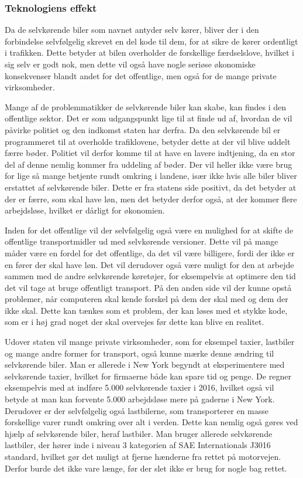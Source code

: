 \subsubsection{Teknologiens effekt}
Da de selvkørende biler som navnet antyder selv kører, bliver der i den forbindelse selvfølgelig skrevet en del kode til dem, for at sikre de kører ordentligt i trafikken. Dette betyder at bilen overholder de forskellige færdselslove, hvilket i sig selv er godt nok, men dette vil også have nogle seriøse økonomiske konsekvenser blandt andet for det offentlige, men også for de mange private virksomheder. 

Mange af de problemmatikker de selvkørende biler kan skabe, kan findes i den offentlige sektor. Det er som udgangspunkt lige til at finde ud af, hvordan de vil påvirke politiet og den indkomst staten har derfra. Da den selvkørende bil er programmeret til at overholde trafiklovene, betyder dette at der vil blive uddelt færre bøder. Politiet vil derfor komme til at have en lavere indtjening, da en stor del af denne nemlig kommer fra uddeling af bøder\cite{B}. Der vil heller ikke være brug for lige så mange betjente rundt omkring i landene, især ikke hvis alle biler bliver erstattet af selvkørende biler. Dette er fra statens side positivt, da det betyder at der er færre, som skal have løn, men det betyder derfor også, at der kommer flere arbejdsløse, hvilket er dårligt for økonomien.

Inden for det offentlige vil der selvfølgelig også være en mulighed for at skifte de offentlige transportmidler ud med selvkørende versioner. Dette vil på mange måder være en fordel for det offentlige, da det vil være billigere, fordi der ikke er en fører der skal have løn. Det vil derudover også være muligt for den at arbejde sammen med de andre selvkørende køretøjer, for eksempelvis at optimere den tid det vil tage at bruge offentligt transport. På den anden side vil der kunne opstå problemer, når computeren skal kende forskel på dem der skal med og dem der ikke skal. Dette kan tænkes som et problem, der kan løses med et stykke kode, som er i høj grad noget der skal overvejes før dette kan blive en realitet\cite{BUS}.

Udover staten vil mange private virksomheder, som for eksempel taxier, lastbiler og mange andre former for transport, også kunne mærke denne ændring til selvkørende biler. Man er allerede i New York begyndt at eksperimentere med selvkørende taxier, hvilket for firmaerne både kan spare tid og penge. De regner eksempelvis med at indføre 5.000 selvkørende taxier i 2016, hvilket også vil betyde at man kan forvente 5.000 arbejdsløse mere på gaderne i New York\cite{TAXI}. Derudover er der selvfølgelig også lastbilerne, som transporterer en masse forskellige varer rundt omkring over alt i verden. Dette kan nemlig også gøres ved hjælp af selvkørende biler, heraf lastbiler. Man bruger allerede selvkørende lastbiler, der hører inde i niveau 3 kategorien af SAE Internationals J3016 standard, hvilket gør det muligt at fjerne hænderne fra rettet på motorvejen. Derfor burde det ikke vare længe, før der slet ikke er brug for nogle bag rettet\cite{TRUCKS}. 

